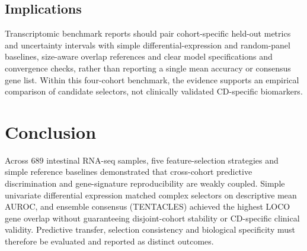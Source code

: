 \subsection{Implications}
\label{sec:discussion_implications}
Transcriptomic benchmark reports should pair cohort-specific held-out metrics and uncertainty intervals with simple differential-expression and random-panel baselines, size-aware overlap references and clear model specifications and convergence checks, rather than reporting a single mean accuracy or consensus gene list. Within this four-cohort benchmark, the evidence supports an empirical comparison of candidate selectors, not clinically validated CD-specific biomarkers.

\section{Conclusion}
\label{sec:conclusion}
Across 689 intestinal RNA-seq samples, five feature-selection strategies and simple reference baselines demonstrated that cross-cohort predictive discrimination and gene-signature reproducibility are weakly coupled. Simple univariate differential expression matched complex selectors on descriptive mean AUROC, and ensemble consensus (TENTACLES) achieved the highest LOCO gene overlap without guaranteeing disjoint-cohort stability or CD-specific clinical validity. Predictive transfer, selection consistency and biological specificity must therefore be evaluated and reported as distinct outcomes.
